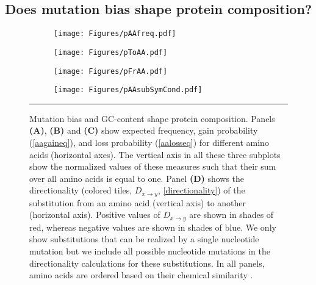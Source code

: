 \documentclass[12pt,a4paper]{article}
\begin{document}
\subsection{Does mutation bias shape protein composition?}

\begin{figure}[!t]
\centering
\begin{subfigure}{0.47\textwidth}
\caption{}
\flushleft
\texttt{[image: Figures/pAAfreq.pdf]}
\end{subfigure}\hfill%
\begin{subfigure}{0.47\textwidth}
\caption{}
\flushleft
\texttt{[image: Figures/pToAA.pdf]}
\end{subfigure}

\vspace{1em}

\begin{subfigure}[t]{0.47\textwidth}
\caption{}
\flushleft
\texttt{[image: Figures/pFrAA.pdf]}
\end{subfigure}\hfill%
\begin{subfigure}[t]{0.47\textwidth}
\caption{}
\flushright
\texttt{[image: Figures/pAAsubSymCond.pdf]}
\end{subfigure}

\caption{Mutation bias and GC-content shape protein composition. Panels \textbf{(A)}, \textbf{(B)} and \textbf{(C)} show expected frequency, gain probability (\autoref{aagaineq}), and loss probability (\autoref{aalosseq}) for different amino acids (horizontal axes). The vertical axis in all these three subplots show the normalized values of these measures such that their sum over all amino acids is equal to one. Panel \textbf{(D)} shows the directionality (colored tiles, $\textit{D}_{x\to y}$, \autoref{directionality}) of the substitution from an amino acid (vertical axis) to another (horizontal axis). Positive values of $\textit{D}_{x\to y}$ are shown in shades of red, whereas negative values are shown in shades of blue. We only show substitutions that can be realized by a single nucleotide mutation but we include all possible nucleotide mutations in the directionality calculations for these substitutions. In all panels, amino acids are ordered based on their chemical similarity \citep{PMBEC}.}
\label{aafreq}

\vspace{1ex}
\hrule
\end{figure}
\end{document}
